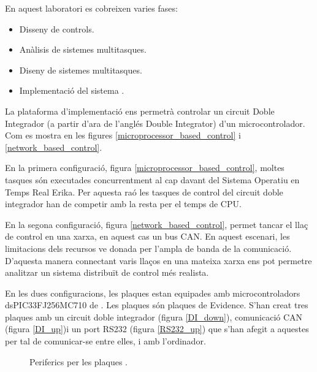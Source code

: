 En aquest laboratori es cobreixen varies fases:

\begin{itemize}
	\item Disseny de controls.
	\item Anàlisis de sistemes \NECS multitasques.
	\item Diseny de sistemes \NECS multitasques.
	\item Implementació del sistema \NECS.
\end{itemize}

La plataforma d'implementació ens permetrà controlar un circuit Doble Integrador (a partir d'ara \DI de l'anglés Double Integrator) d'un microcontrolador. Com es mostra en les figures \ref{microprocessor_based_control} i \ref{network_based_control}.



En la primera configuració, figura \ref{microprocessor_based_control}, moltes tasques són executades concurrentment al cap davant del Sistema Operatiu en Temps Real Erika. Per aquesta raó les tasques de control del circuit doble integrador han de competir amb la resta per el temps de CPU.

En la segona configuració, figura \ref{network_based_control}, permet tancar el llaç de control en una xarxa, en aquest cas un bus CAN. En aquest escenari, les limitacions dels recursos ve donada per l'ampla de banda de la comunicació. D'aquesta manera connectant varis llaços en una mateixa xarxa ens pot permetre analitzar un sistema distribuït de control més realista.

En les dues configuracions, les plaques estan equipades amb microcontroladors dsPIC33FJ256MC710 de \Microchip. Les plaques són plaques \FLEX de Evidence. S'han creat tres plaques amb un circuit doble integrador (figura \ref{DI_down}), comunicació CAN (figura \ref{DI_up})i un port RS232 (figura \ref{RS232_up}) que s'han afegit a aquestes per tal de comunicar-se entre elles, i amb l'ordinador.

\begin{figure}[ht!]
	\begin{center}

		\subfloat[Modul RS232]{\label{RS232_up}
			\texttt{[image: RS232\_up]}
		}
	\end{center}
	\caption{Periferics per les plaques \FLEX.}
    \label{fig:plaques}
\end{figure}

